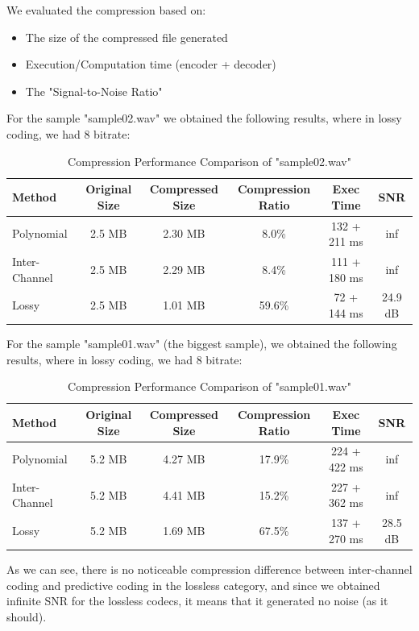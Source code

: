\documentclass[a4paper,14pt]{article}
\begin{document}
We evaluated the compression based on:
    \begin{itemize}
        \item The size of the compressed file generated
        \item Execution/Computation time (encoder + decoder)
        \item The "Signal-to-Noise Ratio"
    \end{itemize}


For the sample "sample02.wav" we obtained the following results, where in lossy coding, we had 8 bitrate:

\begin{table}[H]
\centering
\begin{tabular}{|l|c|c|c|c|c|}
\hline
\textbf{Method} & \textbf{Original Size} & \textbf{Compressed Size} & \textbf{Compression Ratio} & \textbf{Exec Time} & \textbf{SNR}\\
\hline
Polynomial & 2.5 MB & 2.30 MB & 8.0\% & 132 + 211 ms & inf\\
Inter-Channel & 2.5 MB & 2.29 MB & 8.4\% & 111 + 180 ms & inf\\
Lossy & 2.5 MB & 1.01 MB & 59.6\% & 72 + 144 ms & 24.9 dB\\
\hline
\end{tabular}
\caption{Compression Performance Comparison of "sample02.wav"}
\end{table}

For the sample "sample01.wav" (the biggest sample), we obtained the following results, where in lossy coding, we had 8 bitrate:
\begin{table}[H]
\centering
\begin{tabular}{|l|c|c|c|c|c|}
\hline
\textbf{Method} & \textbf{Original Size} & \textbf{Compressed Size} & \textbf{Compression Ratio} & \textbf{Exec Time} & \textbf{SNR}\\
\hline
Polynomial & 5.2 MB & 4.27 MB & 17.9\% & 224 + 422 ms & inf\\ 
Inter-Channel & 5.2 MB & 4.41 MB & 15.2\% & 227 + 362 ms & inf\\
Lossy & 5.2 MB & 1.69 MB & 67.5\% & 137 + 270 ms & 28.5 dB\\
\hline
\end{tabular}
\caption{Compression Performance Comparison of "sample01.wav"}
\end{table}


As we can see, there is no noticeable compression difference between inter-channel coding and predictive coding in the lossless category, and since we obtained infinite SNR for the lossless codecs, it means that it generated no noise (as it should). 
\end{document}
